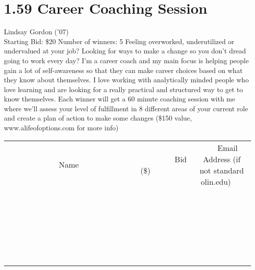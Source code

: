 \documentclass[11pt]{article}
\begin{document}
\section*{1.59 Career Coaching Session}
Lindsay Gordon ('07)
\\
Starting Bid: \$20
\newline
Number of winners: 5
\newline
Feeling overworked, underutilized or undervalued at your job? Looking for ways to make a change so you don't dread going to work every day? I'm a career coach and my main focus is helping people gain a lot of self-awareness so that they can make career choices based on what they know about themselves. I love working with analytically minded people who love learning and are looking for a really practical and structured way to get to know themselves. Each winner will get a 60 minute coaching session with me where we'll assess your level of fulfillment in 8 different areas of your current role and create a plan of action to make some changes (\$150 value, www.alifeofoptions.com for more info)
\\[6ex]
\begin{tabular}{c c c}
~~~~~~~~~~~~~Name~~~~~~~~~~~~~ & ~~~~~~~~~Bid (\$)~~~~~~~~~  & ~~~Email Address (if not standard olin.edu)~~~\\
 & & \\
\hline
 & & \\
\hline
 & & \\
\hline
 & & \\
\hline
 & & \\
\hline
 & & \\
\hline
 & & \\
\hline
 & & \\
\hline
 & & \\
\hline
 & & \\
\hline
 & & \\
\hline
 & & \\
\hline
 & & \\
\hline
 & & \\
\hline
 & & \\
\hline
 & & \\
\hline
 & & \\
\hline
 & & \\
\hline
 & & \\
\hline
 & & \\
\hline
 & & \\
\hline
 & & \\
\hline
 & & \\
\hline
 & & \\
\hline
 & & \\
\hline
 & & \\
\hline
\end{tabular}
\newpage
\end{document}
